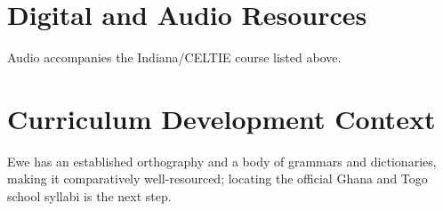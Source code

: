 \documentclass[12pt]{article}
\begin{document}
\section{Digital and Audio Resources}
Audio accompanies the Indiana/CELTIE course listed above.
\section{Curriculum Development Context}
Ewe has an established orthography and a body of grammars and dictionaries, making it comparatively well-resourced; locating the official Ghana and Togo school syllabi is the next step.
\end{document}
